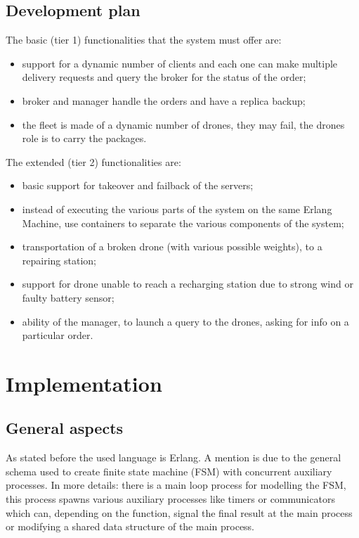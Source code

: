\documentclass[a4paper, oneside]{memoir}
\begin{document}
\section{Development plan}
\label{Development-plan}
The basic (tier 1) functionalities that the system must offer are:
\begin{itemize}
\item support for a dynamic number of clients and each one can make multiple delivery requests and query the broker for the status of the order;
\item broker and manager handle the orders and have a replica backup;
\item the fleet is made of a dynamic number of drones, they may fail, the drones role is to carry the packages.
\end{itemize}

The extended (tier 2) functionalities are:
\begin{itemize}
\item basic support for takeover and failback of the servers;
\item instead of executing the various parts of the system on the same Erlang Machine, use containers to separate the various components of the system;
\item transportation of a broken drone (with various possible weights), to a repairing station;
\item support for drone unable to reach a recharging station due to strong wind or faulty battery sensor;
\item ability of the manager, to launch a query to the drones, asking for info on a particular order.
\end{itemize}


\chapter{Implementation}

\section{General aspects}
As stated before the used language is Erlang. A mention is due to the general schema used to create finite state machine (FSM) with concurrent auxiliary processes.
In more details: there is a main loop process for modelling the FSM, this process spawns various auxiliary processes like timers or communicators which can, depending on the function, signal the final result at the main process or modifying a shared data structure of the main process.
\end{document}

